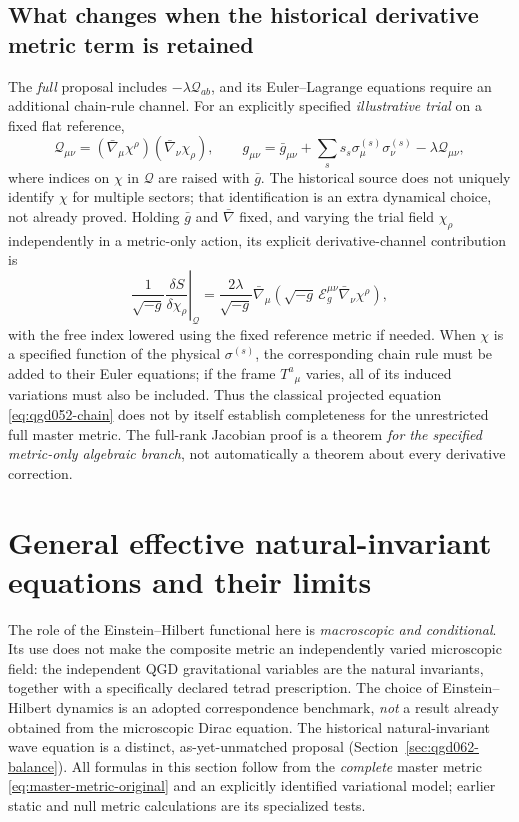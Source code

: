 \documentclass[11pt,a4paper]{article}
\begin{document}
\subsection{What changes when the historical derivative metric term is retained}
The \emph{full} proposal includes $-\lambda\mathcal Q_{ab}$, and its
Euler--Lagrange equations require an additional chain-rule channel.  For
an explicitly specified \emph{illustrative trial} on a fixed flat reference,
\begin{equation}\label{eq:qgd052-trial-Q}
 \mathcal Q_{\mu\nu}=(\bar\nabla_\mu\chi^\rho)
 (\bar\nabla_\nu\chi_\rho),
 \qquad g_{\mu\nu}=\bar g_{\mu\nu}
 +\sum_s s_s\sigma_\mu^{(s)}\sigma_\nu^{(s)}-\lambda\mathcal Q_{\mu\nu},
\end{equation}
where indices on $\chi$ in $\mathcal Q$ are raised with $\bar g$.
The historical source does not uniquely identify $\chi$ for multiple sectors;
that identification is an extra dynamical choice, not already proved.
Holding $\bar g$ and $\bar\nabla$ fixed, and varying the trial field $\chi_\rho$
independently in a metric-only action, its explicit derivative-channel contribution is
\begin{equation}\label{eq:qgd052-Q-variation}
 \left.\frac1{\sqrt{-g}}\frac{\delta S}{\delta\chi_\rho}\right|_{\mathcal Q}
 =\frac{2\lambda}{\sqrt{-g}}\bar\nabla_\mu
 \left(\sqrt{-g}\,\mathcal E_g^{\mu\nu}\bar\nabla_\nu\chi^\rho\right),
\end{equation}
with the free index lowered using the fixed reference metric if needed.
When $\chi$ is a specified function of the physical $\sigma^{(s)}$, the
corresponding chain rule must be added to their Euler equations; if the frame
$T^a{}_\mu$ varies, all of its induced variations must also be included.
Thus the classical projected equation \eqref{eq:qgd052-chain} does not by itself
establish completeness for the unrestricted full master metric.  The
full-rank Jacobian proof is a theorem \emph{for the specified metric-only
algebraic branch}, not automatically a theorem about every derivative correction.


\section{General effective natural-invariant equations and their limits}\label{sec:qgd061-general}
The role of the Einstein--Hilbert functional here is \emph{macroscopic and
conditional}. Its use does not make the composite metric an independently varied
microscopic field: the independent QGD gravitational variables are the natural
invariants, together with a specifically declared tetrad prescription. The
choice of Einstein--Hilbert dynamics is an adopted correspondence benchmark,
\emph{not} a result already obtained from the microscopic Dirac equation.
The historical natural-invariant wave equation is a distinct, as-yet-unmatched
proposal (Section~\ref{sec:qgd062-balance}). All formulas in this section
follow from the \emph{complete} master metric
\eqref{eq:master-metric-original} and an explicitly identified variational
model; earlier static and null metric calculations are its specialized tests.
\end{document}
